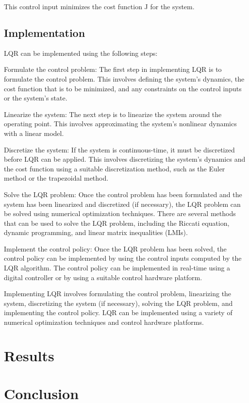 \documentclass[12pt]{article}
\begin{document}
This control input minimizes the cost function J for the system.
\subsection{Implementation}
 LQR can be implemented using the following steps:

Formulate the control problem: The first step in implementing LQR is to formulate the control problem. This involves defining the system's dynamics, the cost function that is to be minimized, and any constraints on the control inputs or the system's state.

Linearize the system: The next step is to linearize the system around the operating point. This involves approximating the system's nonlinear dynamics with a linear model.

Discretize the system: If the system is continuous-time, it must be discretized before LQR can be applied. This involves discretizing the system's dynamics and the cost function using a suitable discretization method, such as the Euler method or the trapezoidal method.

Solve the LQR problem: Once the control problem has been formulated and the system has been linearized and discretized (if necessary), the LQR problem can be solved using numerical optimization techniques. There are several methods that can be used to solve the LQR problem, including the Riccati equation, dynamic programming, and linear matrix inequalities (LMIs).

Implement the control policy: Once the LQR problem has been solved, the control policy can be implemented by using the control inputs computed by the LQR algorithm. The control policy can be implemented in real-time using a digital controller or by using a suitable control hardware platform.

Implementing LQR involves formulating the control problem, linearizing the system, discretizing the system (if necessary), solving the LQR problem, and implementing the control policy. LQR can be implemented using a variety of numerical optimization techniques and control hardware platforms.



\section{Results}
\section{Conclusion}
\end{document}
